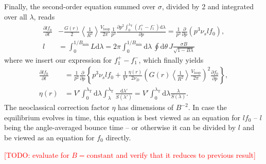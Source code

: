 \documentclass[11pt,a4paper]{article}
\newcommand{\rd}{\ensuremath{\mathrm{d}}}
\newcommand{\sub}[1]{\ensuremath{_{\text{#1}}}}
\begin{document}
Finally, the second-order equation summed over $\sigma$, divided by 2 and integrated over all $\lambda$, reads
\begin{align}
\frac{\partial l f_0}{\partial t} &- \frac{G(r)}{2} \left\langle\frac{1}{R^2}\right\rangle\frac{V\sub{loop}}{2\pi}\frac{1}{p^2}\frac{\partial  p^2\int_0^{\lambda\sub{T}}(f_1^+-f_1^-)\rd\lambda}{\partial p} = \frac{1}{p^2}\frac{\partial}{\partial p}\left( p^3 \nu_s l f_0\right), \nonumber \\
l &= \int_0^{1/B\sub{min}} L\rd\lambda = 2\pi \int_0^{1/B\sub{min}} \rd \lambda \, \oint\rd\theta\, J \frac{\sigma B}{\sqrt{1-B\lambda}}
\end{align}
where we insert our expression for $f_1^+-f_1^-$, which finally yields
\begin{align}
\frac{\partial lf_0}{\partial t} &= \frac{1}{p^2}\frac{\partial}{\partial p}\left\{ p^3\nu_s lf_0 +\frac{1}{V'}\frac{\eta(r)}{2\nu_D} \left(G(r)\left\langle\frac{1}{R^2}\right\rangle\frac{V\sub{loop}}{2\pi}\right)^2\frac{\partial f_0}{\partial p}\right\}, \nonumber \\
\eta(r) &= V'\int_0^{\lambda\sub{T}} \rd \lambda \int_\lambda^{\lambda\sub{T}} \frac{\rd \lambda'}{S(\lambda')} =V' \int_0^{\lambda\sub{T}} \rd \lambda \frac{\lambda}{S(\lambda)}.
\end{align}
The neoclassical correction factor $\eta$ has dimensions of $B^{-2}$. In case the equilibrium evolves in time, this equation is best viewed as an equation for $lf_0$ -- $l$ being the angle-averaged bounce time -- or otherwise it can be divided by $l$ and be viewed as an equation for $f_0$ directly. 

\noindent \textcolor{red}{[TODO: evaluate for $B=\text{constant}$ and verify that it reduces to previous result]}
\end{document}
